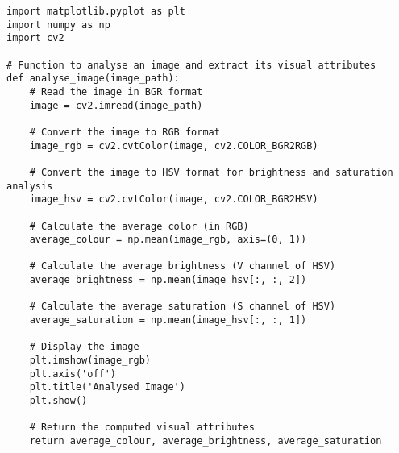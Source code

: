 \begin{lstlisting}
import matplotlib.pyplot as plt
import numpy as np
import cv2

# Function to analyse an image and extract its visual attributes
def analyse_image(image_path):
    # Read the image in BGR format
    image = cv2.imread(image_path)
    
    # Convert the image to RGB format
    image_rgb = cv2.cvtColor(image, cv2.COLOR_BGR2RGB)
    
    # Convert the image to HSV format for brightness and saturation analysis
    image_hsv = cv2.cvtColor(image, cv2.COLOR_BGR2HSV)
    
    # Calculate the average color (in RGB)
    average_colour = np.mean(image_rgb, axis=(0, 1))
    
    # Calculate the average brightness (V channel of HSV)
    average_brightness = np.mean(image_hsv[:, :, 2])
    
    # Calculate the average saturation (S channel of HSV)
    average_saturation = np.mean(image_hsv[:, :, 1])
    
    # Display the image
    plt.imshow(image_rgb)
    plt.axis('off')
    plt.title('Analysed Image')
    plt.show()
    
    # Return the computed visual attributes
    return average_colour, average_brightness, average_saturation
\end{lstlisting}
